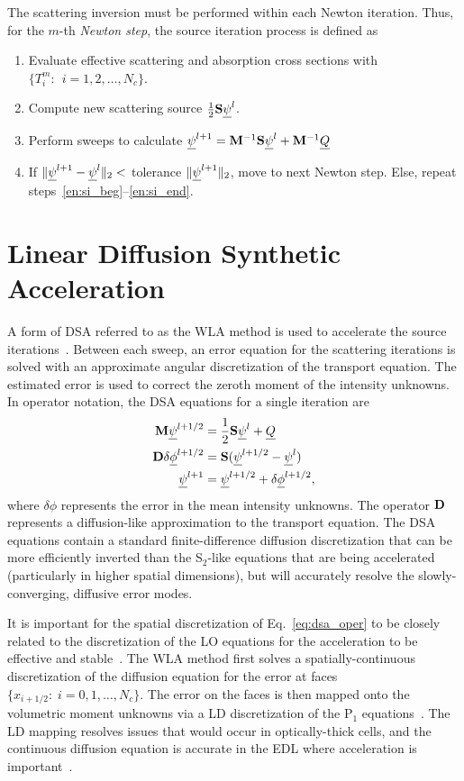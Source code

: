 The scattering inversion must be
performed within each Newton iteration.  Thus, for the $m$-th \emph{Newton step}, the source
iteration process is defined as
\begin{enumerate}
    \item Evaluate effective scattering and absorption cross sections with
        ${\{T^m_i:\;\, i=1,2,\ldots,N_c\}}$.
    \item\label{en:si_beg} Compute new scattering source $\frac{1}{2}\mathbf{S} \underline{\psi}^l$.
    \item Perform sweeps to calculate $\underline{\psi}^{l+1} = \mathbf{M}^{-1} \mathbf{S}\underline{\psi}^{l} + \mathbf{M}^{-1} \underline{Q}$
    \item\label{en:si_end} If $\|\underline{\psi}^{l+1} - \underline{\psi}^{l} \|_2 < $ tolerance
        $\|\underline{\psi}^{l+1}\|_2$, move to next Newton step. Else, repeat steps~\ref{en:si_beg}--\ref{en:si_end}.
\end{enumerate}

\section{Linear Diffusion Synthetic Acceleration}

A form of DSA referred to as the WLA method is used to accelerate the source
iterations~\cite{wla,wla_thesis}. 
Between each sweep, an error equation for the scattering iterations is solved with an approximate angular
discretization of the transport equation.  The estimated error is used to correct the
zeroth moment of the intensity unknowns.  In operator notation, the DSA equations for a single
iteration are
\begin{align}
    \mathbf{M} \underline{\psi}^{l+1/2} &= \frac{1}{2}\mathbf{S} \underline{\psi}^{l} + \underline{Q} \\
    \mathbf{D} \delta \underline{\phi}^{l+1/2} &= \mathbf{S} (\underline{\psi}^{l+1/2} - \underline{\psi}^{l}) \label{eq:dsa_oper} \\
     \underline{\psi}^{l+1} &= \underline{\psi}^{l+1/2} + \delta \underline{\phi}^{l+1/2},
\end{align}
where $\delta \phi$ represents the error in the mean intensity unknowns.
The operator $\mathbf{D}$ represents a diffusion-like approximation to the transport equation. The DSA equations contain a standard
finite-difference diffusion discretization that can be more efficiently
inverted than the S$_2$-like equations that are being accelerated (particularly in higher
spatial dimensions), but will accurately resolve the
slowly-converging, diffusive error modes. 

It is important for the spatial discretization of Eq.~\eqref{eq:dsa_oper} to be closely related to the discretization of the LO equations for the
acceleration to be effective and stable~\cite{adams_dsa}.  The WLA method first solves a spatially-continuous
discretization of the diffusion equation
for the error at faces $\{x_{i+1/2}:\; i=0,1,\ldots,N_c\}$.  The error on the faces is then mapped onto the
volumetric moment unknowns via a LD discretization of the P$_1$ equations~\cite{wla}.
The LD mapping resolves issues that would occur in optically-thick cells, and the
continuous diffusion equation is accurate in the EDL where acceleration is important~\cite{adams_dsa}.

